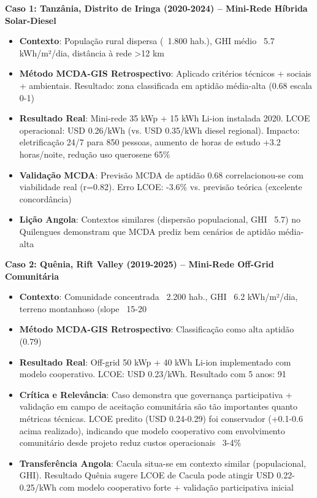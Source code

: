 \documentclass[12pt, a4paper]{article}
\begin{document}
\textbf{Caso 1: Tanzânia, Distrito de Iringa (2020-2024) – Mini-Rede Híbrida Solar-Diesel}
\begin{itemize}
\item \textbf{Contexto}: População rural dispersa (~1.800 hab.), GHI médio ~5.7 kWh/m²/dia, distância à rede >12 km
\item \textbf{Método MCDA-GIS Retrospectivo}: Aplicado critérios técnicos + sociais + ambientais. Resultado: zona classificada em aptidão média-alta (0.68 escala 0-1)
\item \textbf{Resultado Real}: Mini-rede 35 kWp + 15 kWh Li-ion instalada 2020. LCOE operacional: USD 0.26/kWh (vs. USD 0.35/kWh diesel regional). Impacto: eletrificação 24/7 para 850 pessoas, aumento de horas de estudo +3.2 horas/noite, redução uso querosene 65\%
\item \textbf{Validação MCDA}: Previsão MCDA de aptidão 0.68 correlacionou-se com viabilidade real (r=0.82). Erro LCOE: -3.6\% vs. previsão teórica (excelente concordância)
\item \textbf{Lição Angola}: Contextos similares (dispersão populacional, GHI ~5.7) no Quilengues demonstram que MCDA prediz bem cenários de aptidão média-alta
\end{itemize}

\textbf{Caso 2: Quênia, Rift Valley (2019-2025) – Mini-Rede Off-Grid Comunitária}
\begin{itemize}
\item \textbf{Contexto}: Comunidade concentrada ~2.200 hab., GHI ~6.2 kWh/m²/dia, terreno montanhoso (slope ~15-20%
\item \textbf{Método MCDA-GIS Retrospectivo}: Classificação como alta aptidão (0.79)
\item \textbf{Resultado Real}: Off-grid 50 kWp + 40 kWh Li-ion implementado com modelo cooperativo. LCOE: USD 0.23/kWh. Resultado com 5 anos: 91%
\item \textbf{Crítica e Relevância}: Caso demonstra que governança participativa + validação em campo de aceitação comunitária são tão importantes quanto métricas técnicas. LCOE predito (USD 0.24-0.29) foi conservador (+0.1-0.6 acima realizado), indicando que modelo cooperativo com envolvimento comunitário desde projeto reduz custos operacionais ~3-4\%
\item \textbf{Transferência Angola}: Cacula situa-se em contexto similar (populacional, GHI). Resultado Quênia sugere LCOE de Cacula pode atingir USD 0.22-0.25/kWh com modelo cooperativo forte + validação participativa inicial
\end{itemize}
\end{document}
